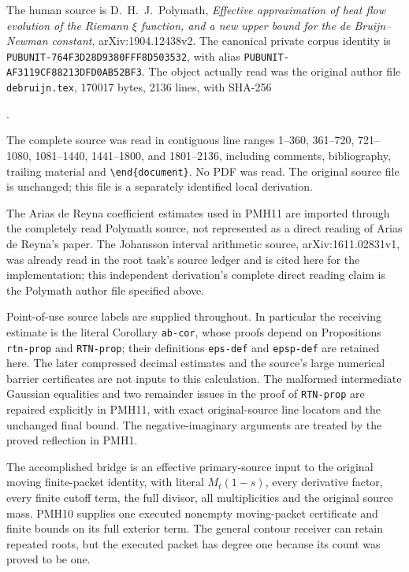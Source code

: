\documentclass[11pt]{article}
\begin{document}
The human source is D.~H.~J.~Polymath,
\emph{Effective approximation of heat flow evolution of the Riemann
$\xi$ function, and a new upper bound for the de Bruijn--Newman
constant}, arXiv:1904.12438v2. The canonical private corpus identity
is \texttt{PUBUNIT-764F3D28D9380FFF8D503532}, with alias
\texttt{PUBUNIT-AF3119CF88213DFD0AB52BF3}. The object actually read
was the original author file \texttt{debruijn.tex}, 170017 bytes,
2136 lines, with SHA-256
\begin{center}\small\ttfamily
{}.
\end{center}
The complete source was read in contiguous line ranges 1--360,
361--720, 721--1080, 1081--1440, 1441--1800, and 1801--2136,
including comments, bibliography, trailing material and
\texttt{\textbackslash end\{document\}}. No PDF was read. The original source file is
unchanged; this file is a separately identified local derivation.

The Arias de Reyna coefficient estimates used in PMH11 are imported
through the completely read Polymath source, not represented as a
direct reading of Arias de Reyna's paper. The Johansson interval
arithmetic source, arXiv:1611.02831v1, was already read in the root
task's source ledger and is cited here for the implementation;
this independent derivation's complete direct reading claim is
the Polymath author file specified above.

Point-of-use source labels are supplied throughout. In particular
the receiving estimate is the literal Corollary \texttt{ab-cor},
whose proofs depend on Propositions \texttt{rtn-prop} and
\texttt{RTN-prop}; their definitions \texttt{eps-def} and
\texttt{epsp-def} are retained here. The later compressed decimal
estimates and the source's large numerical barrier certificates
are not inputs to this calculation. The malformed intermediate
Gaussian equalities and two remainder issues in the proof of
\texttt{RTN-prop} are repaired explicitly in PMH11, with exact
original-source line locators and the unchanged final bound.
The negative-imaginary
arguments are treated by the proved reflection in PMH1.

The accomplished bridge is an effective primary-source input to
the original moving finite-packet identity, with literal
$M_t(1-s)$, every derivative factor, every finite cutoff term,
the full divisor, all multiplicities and the original source mass.
PMH10 supplies one executed nonempty moving-packet certificate and
finite bounds on its full exterior term. The general contour
receiver can retain repeated roots, but the executed packet has
degree one because its count was proved to be one.
\end{document}
